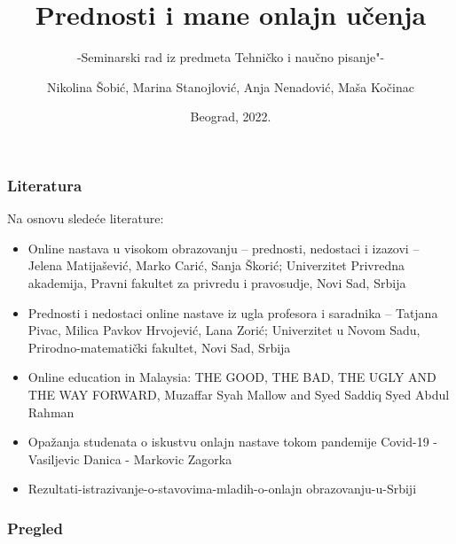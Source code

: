\documentclass[11pt]{beamer}
\begin{document}
\author{\small{Nikolina Šobić, Marina Stanojlović, Anja Nenadović, Maša Kočinac}}
	\title{Prednosti i mane onlajn učenja}
	\subtitle{-Seminarski rad iz predmeta Tehničko i naučno pisanje"-}
	\date{
		\footnotesize{Beograd, 2022.}	
}

\begin{frame}[plain]
		\maketitle
\end{frame}
	
	
	\addtocounter{framenumber}{-1}
	
\begin{frame}[fragile]
		\frametitle{Literatura}
		 Na osnovu sledeće literature:\\
		\begin{itemize}
	
		\item
		    Online nastava u visokom obrazovanju – prednosti, nedostaci i izazovi – Jelena Matijašević, Marko Carić, Sanja Škorić; Univerzitet Privredna akademija, Pravni fakultet za privredu i pravosudje, Novi Sad, Srbija
		
		\item
		    Prednosti i nedostaci online nastave iz ugla profesora i saradnika – Tatjana Pivac, Milica Pavkov Hrvojević, Lana Zorić; Univerzitet u Novom Sadu, Prirodno-matematički fakultet, Novi Sad, Srbija
		
		\item
    	    Online education in Malaysia: THE GOOD, THE BAD, THE UGLY AND THE WAY FORWARD, Muzaffar Syah Mallow and Syed Saddiq Syed Abdul Rahman
		
		
		
		\item
		     Opažanja studenata o iskustvu onlajn nastave tokom pandemije Covid-19 - Vasiljevic Danica - Markovic Zagorka
		
		\item
		       Rezultati-istrazivanje-o-stavovima-mladih-o-onlajn obrazovanju-u-Srbiji
		
		
		\end{itemize}
\end{frame}


\begin{frame}
		\frametitle{Pregled}
		\tableofcontents[hidesubsections] 

\end{frame}
\end{document}
